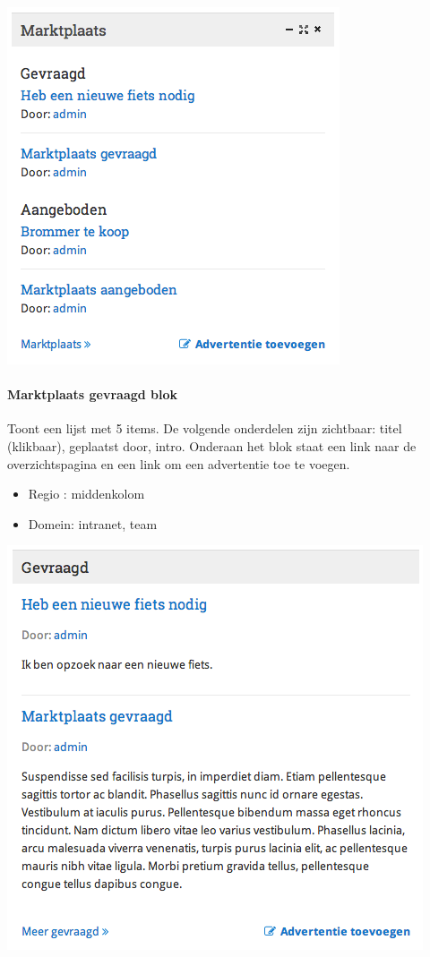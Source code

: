 \begin{center}
	\includegraphics[scale=0.5]{img/blokken/marktplaatslijst.png}
\end{center}

\paragraph{Marktplaats gevraagd blok}

Toont een lijst met 5 items. De volgende onderdelen zijn zichtbaar: titel (klikbaar), geplaatst door, intro. Onderaan het blok staat een link naar de overzichtspagina en een link om een advertentie toe te voegen.

\begin{itemize}
\item Regio : middenkolom
\item Domein: intranet, team
\end{itemize}

\begin{center}
	\includegraphics[scale=0.5]{img/blokken/marktplaatsgevraagd.png}
\end{center}


